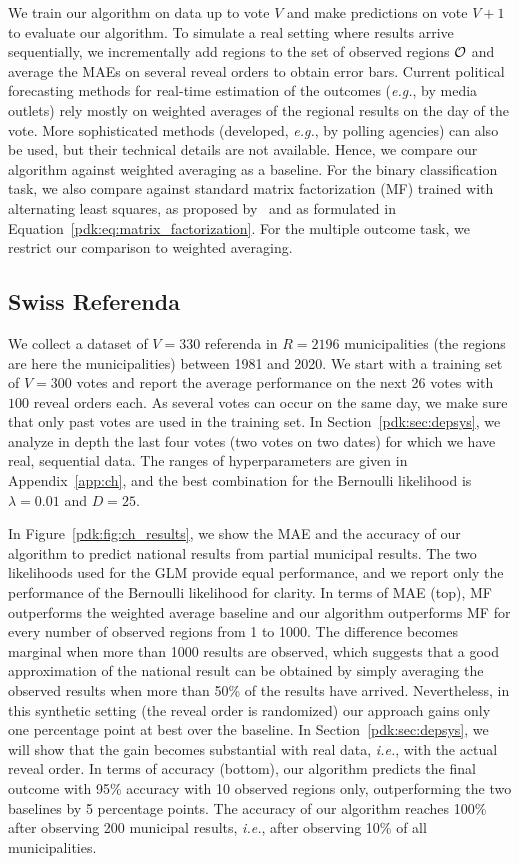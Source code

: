 We train our algorithm on data up to vote $V$ and make predictions on vote $V+1$ to evaluate our algorithm.
To simulate a real setting where results arrive sequentially, we incrementally add regions to the set of observed regions $\mathcal{O}$ and average the MAEs on several reveal orders to obtain error bars.
Current political forecasting methods for real-time estimation of the outcomes (\textit{e.g.}, by media outlets) rely mostly on weighted averages of the regional results on the day of the vote.
More sophisticated methods (developed, \textit{e.g.}, by polling agencies) can also be used, but their technical details are not available.
Hence, we compare our algorithm against weighted averaging as a baseline.
For the binary classification task, we also compare against standard matrix factorization (MF) trained with alternating least squares, as proposed by~\citet{etter2016online} and as formulated in Equation~\eqref{pdk:eq:matrix_factorization}.
For the multiple outcome task, we restrict our comparison to weighted averaging.

\subsection{Swiss Referenda}
\label{pdk:sec:swiss_referenda}

We collect a dataset of $V=330$ referenda in $R=2196$ municipalities (the regions are here the municipalities) between 1981 and 2020.
We start with a training set of $V=300$ votes and report the average performance on the next 26 votes with $100$ reveal orders each.
As several votes can occur on the same day, we make sure that only past votes are used in the training set.
In Section~\ref{pdk:sec:depsys}, we analyze in depth the last four votes (two votes on two dates) for which we have real, sequential data.
The ranges of hyperparameters are given in Appendix~\ref{app:ch}, and the best combination for the Bernoulli likelihood is $\lambda = 0.01 $ and $D = 25$.

In Figure~\ref{pdk:fig:ch_results}, we show the MAE and the accuracy of our algorithm to predict national results from partial municipal results.
The two likelihoods used for the GLM provide equal performance, and we report only the performance of the Bernoulli likelihood for clarity.
In terms of MAE (top), MF outperforms the weighted average baseline and our algorithm outperforms MF for every number of observed regions from 1 to 1000.
The difference becomes marginal when more than 1000 results are observed, which suggests that a good approximation of the national result can be obtained by simply averaging the observed results when more than 50\% of the results have arrived.
Nevertheless, in this synthetic setting (the reveal order is randomized) our approach gains only one percentage point at best over the baseline.
In Section~\ref{pdk:sec:depsys}, we will show that the gain becomes substantial with real data, \textit{i.e.}, with the actual reveal order.
In terms of accuracy (bottom), our algorithm predicts the final outcome with 95\% accuracy with 10 observed regions only, outperforming the two baselines by 5 percentage points.
The accuracy of our algorithm reaches 100\% after observing 200 municipal results, \textit{i.e.}, after observing 10\% of all municipalities.

